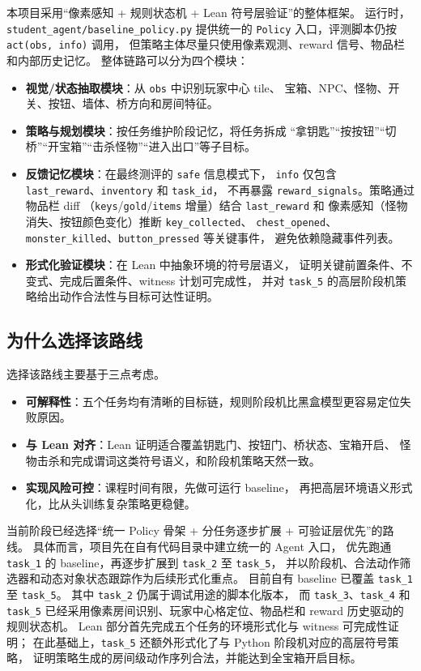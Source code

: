 \documentclass[12pt,a4paper]{ctexart}
\begin{document}
本项目采用“像素感知 + 规则状态机 + Lean 符号层验证”的整体框架。
运行时，\texttt{student\_agent/baseline\_policy.py} 提供统一的
\texttt{Policy} 入口，评测脚本仍按 \texttt{act(obs, info)} 调用，
但策略主体尽量只使用像素观测、reward 信号、物品栏和内部历史记忆。
整体链路可以分为四个模块：
\begin{itemize}[leftmargin=2em]
  \item \textbf{视觉/状态抽取模块}：从 \texttt{obs} 中识别玩家中心 tile、
  宝箱、NPC、怪物、开关、按钮、墙体、桥方向和房间特征。
  \item \textbf{策略与规划模块}：按任务维护阶段记忆，将任务拆成
  “拿钥匙”“按按钮”“切桥”“开宝箱”“击杀怪物”“进入出口”等子目标。
  \item \textbf{反馈记忆模块}：在最终测评的 \texttt{safe} 信息模式下，
  \texttt{info} 仅包含 \texttt{last\_reward}、\texttt{inventory} 和 \texttt{task\_id}，
  不再暴露 \texttt{reward\_signals}。策略通过物品栏 diff
  （\texttt{keys}/\texttt{gold}/\texttt{items} 增量）结合 \texttt{last\_reward} 和
  像素感知（怪物消失、按钮颜色变化）推断 \texttt{key\_collected}、
  \texttt{chest\_opened}、\texttt{monster\_killed}、\texttt{button\_pressed} 等关键事件，
  避免依赖隐藏事件列表。
  \item \textbf{形式化验证模块}：在 Lean 中抽象环境的符号层语义，
  证明关键前置条件、不变式、完成后置条件、witness 计划可完成性，
  并对 \texttt{task\_5} 的高层阶段机策略给出动作合法性与目标可达性证明。
\end{itemize}

\subsection{为什么选择该路线}

选择该路线主要基于三点考虑。
\begin{itemize}[leftmargin=2em]
  \item \textbf{可解释性}：五个任务均有清晰的目标链，规则阶段机比黑盒模型更容易定位失败原因。
  \item \textbf{与 Lean 对齐}：Lean 证明适合覆盖钥匙门、按钮门、桥状态、宝箱开启、
  怪物击杀和完成谓词这类符号语义，和阶段机策略天然一致。
  \item \textbf{实现风险可控}：课程时间有限，先做可运行 baseline，
  再把高层环境语义形式化，比从头训练复杂策略更稳健。
\end{itemize}

当前阶段已经选择“统一 Policy 骨架 + 分任务逐步扩展 + 可验证层优先”的路线。
具体而言，项目先在自有代码目录中建立统一的 Agent 入口，
优先跑通 \texttt{task\_1} 的 baseline，再逐步扩展到 \texttt{task\_2} 至 \texttt{task\_5}，
并以阶段机、合法动作筛选器和动态对象状态跟踪作为后续形式化重点。
目前自有 baseline 已覆盖 \texttt{task\_1} 至 \texttt{task\_5}。
其中 \texttt{task\_2} 仍属于调试用途的脚本化版本，
而 \texttt{task\_3}、\texttt{task\_4} 和 \texttt{task\_5}
已经采用像素房间识别、玩家中心格定位、物品栏和 reward 历史驱动的规则状态机。
Lean 部分首先完成五个任务的环境形式化与 witness 可完成性证明；
在此基础上，\texttt{task\_5} 还额外形式化了与 Python 阶段机对应的高层符号策略，
证明策略生成的房间级动作序列合法，并能达到全宝箱开启目标。
\end{document}
